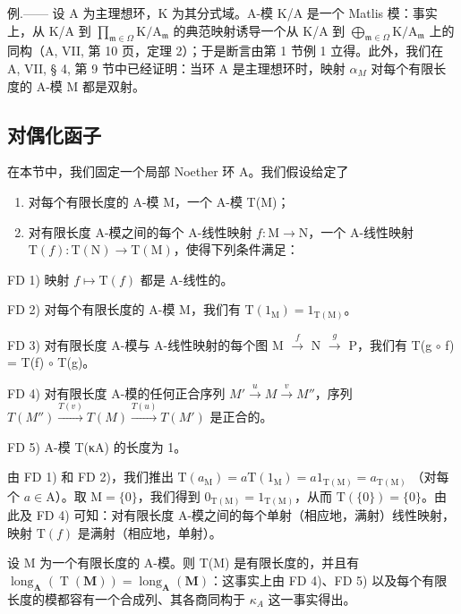 例.—— 设 A 为主理想环，K 为其分式域。A-模 K/A 是一个 Matlis 模：事实上，从 K/A 到 \(\prod_{\mathfrak{m}\in\Omega}\mathrm{K}/\mathrm{A}_{\mathfrak{m}}\) 的典范映射诱导一个从 K/A 到 \(\bigoplus_{\mathfrak{m}\in\Omega}\mathrm{K}/\mathrm{A}_{\mathfrak{m}}\) 上的同构（A, VII, 第 10 页，定理 2）；于是断言由第 1 节例 1 立得。此外，我们在 A, VII, § 4, 第 9 节中已经证明：当环 A 是主理想环时，映射 \(\alpha_{M}\) 对每个有限长度的 A-模 M 都是双射。

\subsection{对偶化函子}

在本节中，我们固定一个局部 Noether 环 A。我们假设给定了

\begin{enumerate}
\def\labelenumi{\alph{enumi})}
\item
  对每个有限长度的 A-模 M，一个 A-模 T(M)；
\item
  对有限长度 A-模之间的每个 A-线性映射 \(f: \mathrm{M} \to \mathrm{N}\)，一个 A-线性映射 \(\mathrm{T}(f): \mathrm{T}(\mathrm{N}) \to \mathrm{T}(\mathrm{M})\)，使得下列条件满足：
\end{enumerate}

FD 1) 映射 \(f \mapsto \mathrm{T}(f)\) 都是 A-线性的。

FD 2) 对每个有限长度的 A-模 M，我们有 \(\mathrm{T}(1_{\mathrm{M}}) = 1_{\mathrm{T(M)}}\)。

FD 3) 对有限长度 A-模与 A-线性映射的每个图 M \(\xrightarrow{f}\) N \(\xrightarrow{g}\) P，我们有 T(g \(\circ\) f) = T(f) \(\circ\) T(g)。

FD 4) 对有限长度 A-模的任何正合序列 \(M' \xrightarrow{u} M \xrightarrow{v} M''\)，序列 \(T(M'') \xrightarrow{T(v)} T(M) \xrightarrow{T(u)} T(M')\) 是正合的。

FD 5) A-模 T(κA) 的长度为 1。

由 FD 1) 和 FD 2)，我们推出 \(\mathrm{T}(a_{\mathrm{M}}) = a\mathrm{T}(1_{\mathrm{M}}) = a1_{\mathrm{T(M)}} = a_{\mathrm{T(M)}}\) （对每个 \(a \in \mathrm{A}\)）。取 \(\mathrm{M} = \{0\}\)，我们得到 \(0_{\mathrm{T(M)}} = 1_{\mathrm{T(M)}}\)，从而 \(\mathrm{T}(\{0\}) = \{0\}\)。由此及 FD 4) 可知：对有限长度 A-模之间的每个单射（相应地，满射）线性映射，映射 \(\mathrm{T}(f)\) 是满射（相应地，单射）。

设 M 为一个有限长度的 A-模。则 T(M) 是有限长度的，并且有 \(\operatorname{long}_{\mathbf{A}}(\operatorname{T}(\mathbf{M})) = \operatorname{long}_{\mathbf{A}}(\mathbf{M})\)：这事实上由 FD 4)、FD 5) 以及每个有限长度的模都容有一个合成列、其各商同构于 \(\kappa_{A}\) 这一事实得出。

